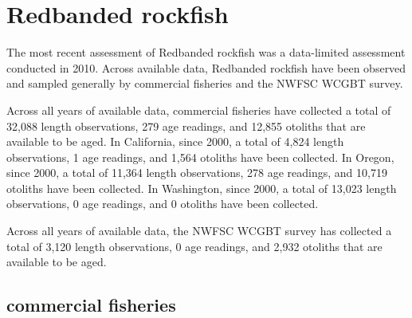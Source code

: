 \documentclass[11pt,
  english,
  letterpaper,
]{article}
\begin{document}

\hypertarget{redbanded-rockfish}{%
\section{Redbanded rockfish}\label{redbanded-rockfish}}

\leavevmode\tagmcend\tagstructend


The most recent assessment of Redbanded rockfish was a data-limited assessment conducted in 2010. Across available data, Redbanded rockfish have been observed and sampled generally by commercial fisheries and the NWFSC WCGBT survey.

\leavevmode\tagmcend\tagstructend\par


Across all years of available data, commercial fisheries have collected a total of 32,088 length observations, 279 age readings, and 12,855 otoliths that are available to be aged. In California, since 2000, a total of 4,824 length observations, 1 age readings, and 1,564 otoliths have been collected. In Oregon, since 2000, a total of 11,364 length observations, 278 age readings, and 10,719 otoliths have been collected. In Washington, since 2000, a total of 13,023 length observations, 0 age readings, and 0 otoliths have been collected.

\leavevmode\tagmcend\tagstructend\par


Across all years of available data, the NWFSC WCGBT survey has collected a total of 3,120 length observations, 0 age readings, and 2,932 otoliths that are available to be aged.

\leavevmode\tagmcend\tagstructend\par


\hypertarget{commercial-fisheries-38}{%
\subsection{commercial fisheries}\label{commercial-fisheries-38}}

\leavevmode\tagmcend\tagstructend

\end{document}
